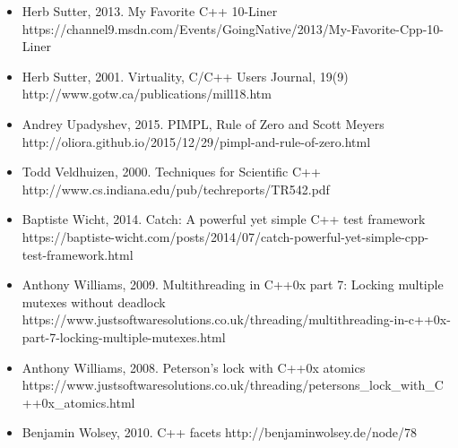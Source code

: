\begin{itemize}
\item Herb Sutter, 2013. My Favorite C++ 10-Liner https://\allowbreak{}channel9.\allowbreak{}msdn.\allowbreak{}com/\allowbreak{}Events/\allowbreak{}GoingNative/\allowbreak{}2013/\allowbreak{}My-\allowbreak{}Favorite-\allowbreak{}Cpp-\allowbreak{}10-\allowbreak{}Liner



\item Herb Sutter, 2001. Virtuality, C/C++ Users Journal, 19(9) http://\allowbreak{}www.\allowbreak{}gotw.\allowbreak{}ca/\allowbreak{}publications/\allowbreak{}mill18.\allowbreak{}htm



\item Andrey Upadyshev, 2015. PIMPL, Rule of Zero and Scott Meyers http://\allowbreak{}oliora.\allowbreak{}github.\allowbreak{}io/\allowbreak{}2015/\allowbreak{}12/\allowbreak{}29/\allowbreak{}pimpl-\allowbreak{}and-\allowbreak{}rule-\allowbreak{}of-\allowbreak{}zero.\allowbreak{}html



\item Todd Veldhuizen, 2000. Techniques for Scientific C++ http://\allowbreak{}www.\allowbreak{}cs.\allowbreak{}indiana.\allowbreak{}edu/\allowbreak{}pub/\allowbreak{}techreports/\allowbreak{}TR542.\allowbreak{}pdf



\item Baptiste Wicht, 2014. Catch: A powerful yet simple C++ test framework https://\allowbreak{}baptiste-\allowbreak{}wicht.\allowbreak{}com/\allowbreak{}posts/\allowbreak{}2014/\allowbreak{}07/\allowbreak{}catch-\allowbreak{}powerful-\allowbreak{}yet-\allowbreak{}simple-\allowbreak{}cpp-\allowbreak{}test-\allowbreak{}framework.\allowbreak{}html



\item Anthony Williams, 2009. Multithreading in C++0x part 7: Locking multiple mutexes without deadlock https://\allowbreak{}www.\allowbreak{}justsoftwaresolutions.\allowbreak{}co.\allowbreak{}uk/\allowbreak{}threading/\allowbreak{}multithreading-\allowbreak{}in-\allowbreak{}c++0x-\allowbreak{}part-\allowbreak{}7-\allowbreak{}locking-\allowbreak{}multiple-\allowbreak{}mutexes.\allowbreak{}html



\item Anthony Williams, 2008. Peterson’s lock with C++0x atomics https://\allowbreak{}www.\allowbreak{}justsoftwaresolutions.\allowbreak{}co.\allowbreak{}uk/\allowbreak{}threading/\allowbreak{}petersons\_\allowbreak{}lock\_\allowbreak{}with\_\allowbreak{}C++0x\_\allowbreak{}atomics.\allowbreak{}html



\item Benjamin Wolsey, 2010. C++ facets http://\allowbreak{}benjaminwolsey.\allowbreak{}de/\allowbreak{}node/\allowbreak{}78

\end{itemize}
